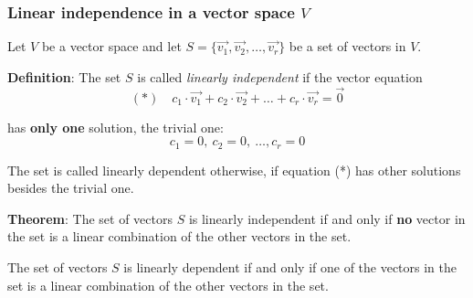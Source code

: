 \begin{frame}[fragile]
\frametitle{Linear independence in a vector space $V$}

Let $V$ be a vector space and let $S = \{ \vec{v_1}, \vec{v_2}, \ldots, \vec{v_r} \}$ be a set of vectors in $V$.



\textbf{Definition}: The set  $S$ is called {\em linearly independent} if the vector equation
\begin{equation*}
(*) \quad  c_1 \cdot \vec{v_1} + c_2 \cdot \vec{v_2} + \ldots + c_r \cdot \vec{v_r} = \vec{0}
\end{equation*}


has \textbf{only one} solution, the trivial one:
$$c_1 = 0, \ c_2 = 0, \ \ldots, c_r = 0$$

The set is called linearly dependent otherwise, if equation (*) has other solutions besides the trivial one.

\textbf{Theorem}: The set of vectors $S$ is linearly independent if and only if \textbf{no} vector in the set is a linear combination of the other vectors in the set.

The set of vectors $S$ is linearly dependent if and only if one of the vectors in the set is a linear combination of the other vectors in the set.
\end{frame}




